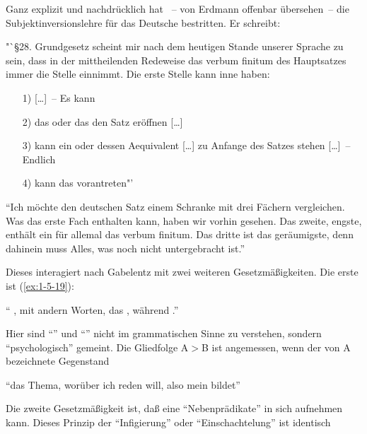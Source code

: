 \documentclass[output=paper]{langsci/langscibook}
\begin{document}
Ganz explizit und nachdrücklich hat \citet{Gabelentz1875}~-- von Erdmann offenbar
übersehen~-- die Subjektinversionslehre für das Deutsche bestritten. Er schreibt:
\begin{exe}\settowidth\jamwidth{144f]{Gabelentz1875}}
\ex\label{ex:1-5-18}
"`§28. Grundgesetz scheint mir nach dem heutigen Stande unserer Sprache
zu sein, dass in der mittheilenden Redeweise das verbum finitum des
Hauptsatzes immer die  Stelle einnimmt. Die erste Stelle kann
inne haben:
\begin{enumerate}
\item[1)]  [\ldots]~– Es kann
\item[2)] das  oder
das  den Satz eröffnen [\ldots]
\item[3)] kann ein  oder dessen Aequivalent [\ldots] zu Anfange des Satzes
stehen [\ldots]~– Endlich
\item[4)] kann das  vorantreten"'
\end{enumerate}

"`Ich möchte den deutschen Satz einem Schranke mit drei Fächern vergleichen. Was das erste Fach enthalten kann, haben wir vorhin gesehen. Das
zweite, engste, enthält ein für allemal das verbum finitum. Das dritte ist das
geräumigste, denn dahinein muss Alles, was noch nicht untergebracht ist."' \citep[146]{Gabelentz1875}
\end{exe}
Dieses  interagiert nach Gabelentz mit zwei weiteren Gesetzmäßigkeiten.
Die erste ist (\ref{ex:1-5-19}):
\begin{exe}
\ex\label{ex:1-5-19}
"`\Hack{\break} ,
mit andern Worten, das , während ."' \citep[137]{Gabelentz1875}
\end{exe}
Hier sind "`"' und "`"' nicht im grammatischen Sinne zu verstehen,
sondern "`psychologisch"' gemeint. Die Gliedfolge A$>$B ist angemessen, wenn der
von A bezeichnete Gegenstand
\begin{exe}
\ex\label{ex:1-5-20}
"`das Thema, worüber ich reden will, also mein  bildet"' \citep[137]{Gabelentz1875}
\end{exe}
Die zweite Gesetzmäßigkeit ist, daß eine  "`Nebenprädikate"' in sich aufnehmen kann. Dieses Prinzip der "`Infigierung"' oder "`Einschachtelung"' ist identisch
\end{document}
